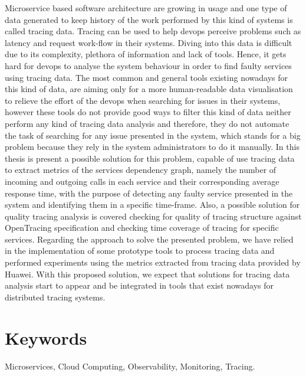Microservice based software architecture are growing in usage and one type of data generated to keep history of the work performed by this kind of systems is called tracing data. Tracing can be used to help \gls{devops} perceive problems such as latency and request work-flow in their systems.
Diving into this data is difficult due to its complexity, plethora of information and lack of tools. Hence, it gets hard for \gls{devops} to analyse the system behaviour in order to find faulty services using tracing data.
The most common and general tools existing nowadays for this kind of data, are aiming only for a more human-readable data visualisation to relieve the effort of the \gls{devops} when searching for issues in their systems, however these tools do not provide good ways to filter this kind of data neither perform any kind of tracing data analysis and therefore, they do not automate the task of searching for any issue presented in the system, which stands for a big problem because they rely in the system administrators to do it manually.
In this thesis is present a possible solution for this problem, capable of use tracing data to extract metrics of the services dependency graph, namely the number of incoming and outgoing calls in each service and their corresponding average response time, with the purpose of detecting any faulty service presented in the system and identifying them in a specific time-frame. Also, a possible solution for quality tracing analysis is covered checking for quality of tracing structure against OpenTracing specification and checking time coverage of tracing for specific services.
Regarding the approach to solve the presented problem, we have relied in the implementation of some prototype tools to process tracing data and performed experiments using the metrics extracted from tracing data provided by Huawei.
With this proposed solution, we expect that solutions for tracing data analysis start to appear and be integrated in tools that exist nowadays for distributed tracing systems.

\section*{Keywords}
\label{sec:keywords}

Microservices, Cloud Computing, Observability, Monitoring, Tracing.

\restoregeometry
